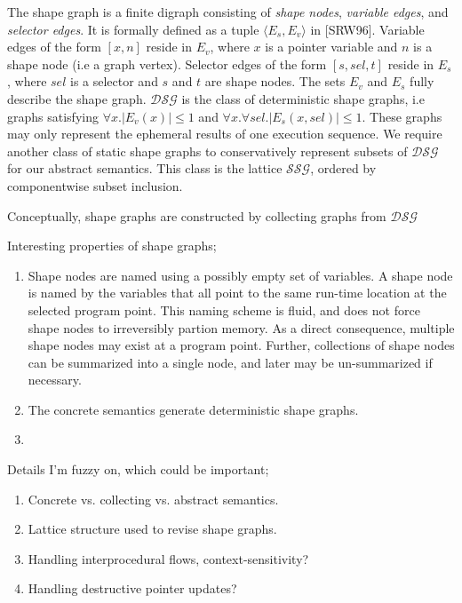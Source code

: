 \documentclass{article}
\begin{document}
The shape graph is a finite digraph consisting of \textit{shape nodes},
\textit{variable edges}, and \textit{selector edges}. It is formally defined
as a tuple $\langle E_s, E_v \rangle$ in [SRW96]. Variable edges of the form
$[x, n]$ reside in $E_v$, where $x$ is a pointer variable and $n$ is a shape
node (i.e a graph vertex). Selector edges of the form $[s, sel, t]$ reside
in $E_s$, where $sel$ is a selector and $s$ and $t$ are shape nodes. The
sets $E_v$ and $E_s$ fully describe the shape graph. $\mathcal{DSG}$ is the
class of deterministic shape graphs, i.e graphs satisfying $\forall x.
|E_v(x)| \leq 1$ and $\forall x. \forall sel. |E_s(x, sel)| \leq 1$. These
graphs may only represent the ephemeral results of one execution sequence.
We require another class of static shape graphs to conservatively represent
subsets of $\mathcal{DSG}$ for our abstract semantics. This class is the
lattice $\mathcal{SSG}$, ordered by componentwise subset inclusion.

Conceptually, shape graphs are constructed by collecting graphs from
$\mathcal{DSG}$ 

Interesting properties of shape graphs;
\begin{enumerate}[1.]
    \item Shape nodes are named using a possibly empty set of variables. A
        shape node is named by the variables that all point to the same
        run-time location at the selected program point. This naming scheme
        is fluid, and does not force shape nodes to irreversibly partion
        memory. As a direct consequence, multiple shape nodes may exist at
        a program point. Further, collections of shape nodes can be
        summarized into a single node, and later may be un-summarized if
        necessary.

    \item The concrete semantics generate deterministic shape graphs.
    \item 
\end{enumerate}

Details I'm fuzzy on, which could be important;
\begin{enumerate}[1.]
    \item Concrete vs. collecting vs. abstract semantics.
    \item Lattice structure used to revise shape graphs.
    \item Handling interprocedural flows, context-sensitivity?
    \item Handling destructive pointer updates?
\end{enumerate}
\end{document}
